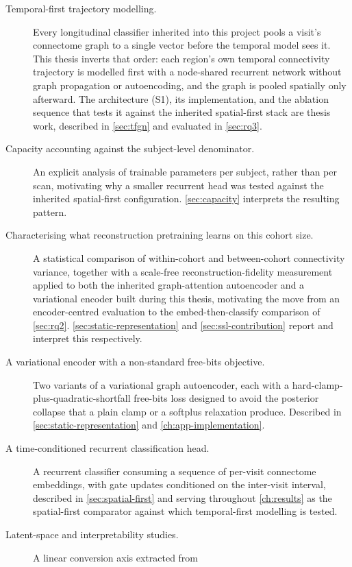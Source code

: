 \begin{description}
  \item[Temporal-first trajectory modelling.] Every longitudinal classifier inherited into
    this project pools a visit's connectome graph to a single vector before the temporal
    model sees it. This thesis inverts that order: each region's own temporal connectivity
    trajectory is modelled first with a node-shared recurrent network without graph propagation
    or autoencoding, and the graph is pooled spatially only afterward. The architecture (S1),
    its implementation, and the ablation sequence that tests it against the inherited spatial-first
    stack are thesis work, described in \autoref{sec:tfgn} and evaluated in \autoref{sec:rq3}.
  \item[Capacity accounting against the subject-level denominator.] An explicit analysis
    of trainable parameters per subject, rather than per scan, motivating why a smaller
    recurrent head was tested against the inherited spatial-first configuration.
    \autoref{sec:capacity} interprets the resulting pattern.
  \item[Characterising what reconstruction pretraining learns on this cohort size.] A
    statistical comparison of within-cohort and between-cohort connectivity variance,
    together with a scale-free reconstruction-fidelity measurement applied to both the
    inherited graph-attention autoencoder and a variational encoder built during this
    thesis, motivating the move from an encoder-centred evaluation to the embed-then-classify
    comparison of \autoref{sec:rq2}. \autoref{sec:static-representation} and
    \autoref{sec:ssl-contribution} report and interpret this respectively.
  \item[A variational encoder with a non-standard free-bits objective.] Two variants of a
    variational graph autoencoder, each with a hard-clamp-plus-quadratic-shortfall
    free-bits loss designed to avoid the posterior collapse that a plain clamp or a
    softplus relaxation produce. Described in \autoref{sec:static-representation} and
    \autoref{ch:app-implementation}.
  \item[A time-conditioned recurrent classification head.] A recurrent classifier
    consuming a sequence of per-visit connectome embeddings, with gate updates conditioned
    on the inter-visit interval, described in \autoref{sec:spatial-first} and serving
    throughout \autoref{ch:results} as the spatial-first comparator against which
    temporal-first modelling is tested.
  \item[Latent-space and interpretability studies.] A linear conversion axis extracted from

\end{description}
